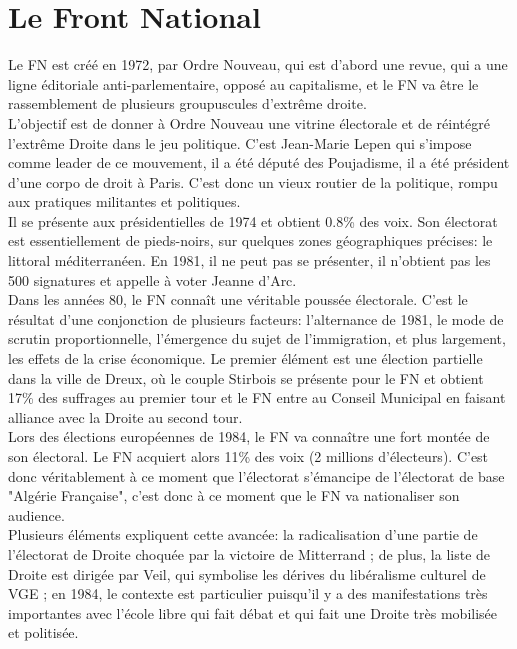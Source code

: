 \documentclass[10pt, a4paper, openany]{book}
\begin{document}
\section{Le Front National}

Le FN est créé en 1972, par Ordre Nouveau, qui est d'abord une revue, qui a une ligne éditoriale anti-parlementaire, opposé au capitalisme, et le FN va être le rassemblement de plusieurs groupuscules d'extrême droite. \\
L'objectif est de donner à Ordre Nouveau une vitrine électorale et de réintégré l'extrême Droite dans le jeu politique. C'est Jean-Marie Lepen qui s'impose comme leader de ce mouvement, il a été député des Poujadisme, il a été président d'une corpo de droit à Paris. C'est donc un vieux routier de la politique, rompu aux pratiques militantes et politiques. \\
Il se présente aux présidentielles de 1974 et obtient 0.8\% des voix. Son électorat est essentiellement de pieds-noirs, sur quelques zones géographiques précises: le littoral méditerranéen. En 1981, il ne peut pas se présenter, il n'obtient pas les 500 signatures et appelle à voter Jeanne d'Arc. \\
Dans les années 80, le FN connaît une véritable poussée électorale. C'est le résultat d'une conjonction de plusieurs facteurs: l'alternance de 1981, le mode de scrutin proportionnelle, l'émergence du sujet de l'immigration, et plus largement, les effets de la crise économique. Le premier élément est une élection partielle dans la ville de Dreux, où le couple Stirbois se présente pour le FN et obtient 17\% des suffrages au premier tour et le FN entre au Conseil Municipal en faisant alliance avec la Droite au second tour. \\
Lors des élections européennes de 1984, le FN va connaître une fort montée de son électoral. Le FN acquiert alors 11\% des voix (2 millions d'électeurs). C'est donc véritablement à ce moment que l'électorat s'émancipe de l'électorat de base "Algérie Française", c'est donc à ce moment que le FN va nationaliser son audience. \\
Plusieurs éléments expliquent cette avancée: la radicalisation d'une partie de l'électorat de Droite choquée par la victoire de Mitterrand ; de plus, la liste de Droite est dirigée par Veil, qui symbolise les dérives du libéralisme culturel de VGE ; en 1984, le contexte est particulier puisqu'il y a des manifestations très importantes avec l'école libre qui fait débat et qui fait une Droite très mobilisée et politisée. \\
\end{document}
